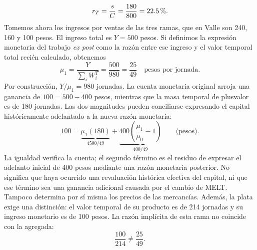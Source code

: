 \documentclass[10pt,twoside]{article}
\newcommand{\pct}{\ifmmode\text{\char37}\else\char37\fi}
\begin{document}
\begin{equation}
r_T=\frac{s}{C}=\frac{180}{800}=22.5\,\pct.\label{eq:rt}
\end{equation}
Tomemos ahora los ingresos por ventas de las tres ramas, que en Valle son 240, 160 y 100 pesos. El ingreso total es $Y=500$ pesos. Si definimos la expresión monetaria del trabajo \emph{ex post} como la razón entre ese ingreso y el valor temporal total recién calculado, obtenemos
\begin{equation}
\mu_1=\frac{Y}{\sum_iW_i^T}=\frac{500}{980}=\frac{25}{49}\quad\text{pesos por jornada}.
\label{eq:melt_expost}
\end{equation}
Por construcción, $Y/\mu_1=980$ jornadas. La cuenta monetaria original arroja una ganancia de $100=500-400$ pesos, mientras que la masa temporal de plusvalor es de 180 jornadas. Las dos magnitudes pueden conciliarse expresando el capital históricamente adelantado a la nueva razón monetaria:
\begin{equation}
100=\underbrace{\mu_1(180)}_{4500/49}+\underbrace{400\left(\frac{\mu_1}{\mu_0}-1\right)}_{400/49}
\qquad\text{(pesos)}.
\label{eq:conciliacion}
\end{equation}
La igualdad verifica la cuenta; el segundo término es el residuo de expresar el adelanto inicial de 400 pesos mediante una razón monetaria posterior. No significa que haya ocurrido una revaluación histórica efectiva del capital, ni que ese término sea una ganancia adicional causada por el cambio de MELT. Tampoco determina por sí misma los precios de las mercancías. Además, la plata exige una distinción: el valor temporal de su producto es de 214 jornadas y su ingreso monetario es de 100 pesos. La razón implícita de esta rama no coincide con la agregada:
\begin{equation}
\frac{100}{214}\ne\frac{25}{49}.
\label{eq:plataMELT}
\end{equation}
\end{document}
